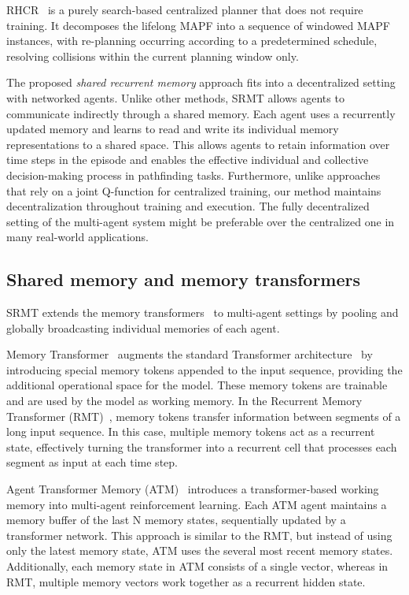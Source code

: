 \documentclass{article} %
\begin{document}
RHCR~\citep{li2021rhcr} is a purely search-based centralized planner that does not require training. It decomposes the lifelong MAPF into a sequence of windowed MAPF instances, with re-planning occurring according to a predetermined schedule, resolving collisions within the current planning window only.

The proposed \textit{shared recurrent memory} approach fits into a decentralized setting with networked agents. Unlike other methods, SRMT allows agents to communicate indirectly through a shared memory. Each agent uses a recurrently updated memory and learns to read and write its individual memory representations to a shared space. This allows agents to retain information over time steps in the episode and enables the effective individual and collective decision-making process in pathfinding tasks. Furthermore, unlike approaches that rely on a joint Q-function for centralized training, our method maintains decentralization throughout training and execution. The fully decentralized setting of the multi-agent system might be preferable over the centralized one in many real-world applications.

\subsection{Shared memory and memory transformers}
SRMT extends the memory transformers~\citep{burtsev2020memory,bulatov2022recurrentmemorytransformer,yang2022transformer,cherepanov2024recurrentactiontransformermemory} to multi-agent settings by pooling and globally broadcasting individual memories of each agent.

Memory Transformer~\citep{burtsev2020memory} augments the standard Transformer architecture~\citep{vaswani2017attention} by introducing special memory tokens appended to the input sequence, providing the additional operational space for the model. These memory tokens are trainable and are used by the model as working memory. In the Recurrent Memory Transformer (RMT)~\citep{bulatov2022recurrentmemorytransformer},
memory tokens transfer information between segments of a long input sequence. In this case, multiple memory tokens act as a recurrent state, effectively turning the transformer into a recurrent cell that processes each segment as input at each time step.

Agent Transformer Memory (ATM)~\citep{yang2022transformer} introduces a transformer-based working memory into multi-agent reinforcement learning. Each ATM agent maintains a memory buffer of the last N memory states, sequentially updated by a transformer network. This approach is similar to the RMT, but instead of using only the latest memory state, ATM uses the several most recent memory states. Additionally, each memory state in ATM consists of a single vector, whereas in RMT, multiple memory vectors work together as a recurrent hidden state.
\end{document}

